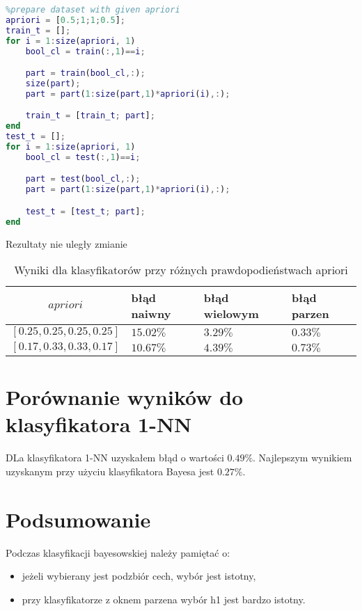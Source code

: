 \documentclass[fleqn]{article}
\begin{document}
\begin{minipage}{\linewidth}
\begin {lstlisting}[language=Matlab]
apriori = [0.5;1;1;0.5];
train_t = [];
for i = 1:size(apriori, 1)
    bool_cl = train(:,1)==i;

    part = train(bool_cl,:);
    size(part);
    part = part(1:size(part,1)*apriori(i),:);

    train_t = [train_t; part];
end
test_t = [];
for i = 1:size(apriori, 1)
    bool_cl = test(:,1)==i;

    part = test(bool_cl,:);
    part = part(1:size(part,1)*apriori(i),:);

    test_t = [test_t; part];
end
\end{lstlisting}
\end{minipage}

Rezultaty nie uległy zmianie


\begin {table}
\begin{center}
\begin{tabular}{clll}
    \hline
    $apriori$ & błąd naiwny & błąd wielowym & błąd parzen \\
    \hline
    $[0.25,0.25,0.25,0.25]$    & $15.02\%$ & $3.29\%$ & $0.33\%$\\
    $[0.17, 0.33, 0.33, 0.17]$ & $10.67\%$ & $4.39\%$ & $0.73\%$\\
    \hline
\end{tabular}
\caption {Wyniki dla klasyfikatorów przy różnych prawdopodieństwach apriori}
\label{table:5}
\end{center}
\end {table}



\section{Porównanie wyników do klasyfikatora 1-NN}
DLa klasyfikatora 1-NN uzyskałem błąd o wartości $0.49\%$. Najlepszym wynikiem uzyskanym przy użyciu klasyfikatora Bayesa jest $0.27\%$.

\section{Podsumowanie}
Podczas klasyfikacji bayesowskiej należy pamiętać o:
\begin{itemize}
    \item jeżeli wybierany jest podzbiór cech, wybór jest istotny,
    \item przy klasyfikatorze z oknem parzena wybór h1 jest bardzo istotny.
\end{itemize}
\end{document}
